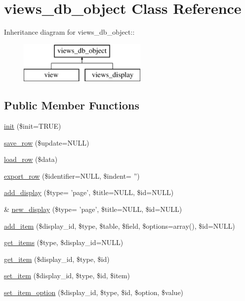 \hypertarget{classviews__db__object}{
\section{views\_\-db\_\-object Class Reference}
\label{classviews__db__object}
}
Inheritance diagram for views\_\-db\_\-object::\begin{figure}[H]
\begin{center}
\leavevmode
\includegraphics[height=2cm]{classviews__db__object}
\end{center}
\end{figure}
\subsection*{Public Member Functions}
\begin{CompactItemize}
\item 
\hyperlink{classviews__db__object_5c50d8a10b9af37afa7c7c2bfde5e318}{init} (\$init=TRUE)
\item 
\hyperlink{classviews__db__object_5e126880af73008d7ce245c24cfaebab}{save\_\-row} (\$update=NULL)
\item 
\hyperlink{classviews__db__object_4c8b658c58eb3ae319616f73a2106324}{load\_\-row} (\$data)
\item 
\hyperlink{classviews__db__object_0b0485d179ad553228534ae957e0ddc9}{export\_\-row} (\$identifier=NULL, \$indent= '')
\item 
\hyperlink{classviews__db__object_6e9c2b7bb3d5670fefde14518a38de95}{add\_\-display} (\$type= 'page', \$title=NULL, \$id=NULL)
\item 
\& \hyperlink{classviews__db__object_b7a8ea5c81d0c335d8e0fb87443349a3}{new\_\-display} (\$type= 'page', \$title=NULL, \$id=NULL)
\item 
\hyperlink{classviews__db__object_794e8375c5d243e52645675b31251ccc}{add\_\-item} (\$display\_\-id, \$type, \$table, \$field, \$options=array(), \$id=NULL)
\item 
\hyperlink{classviews__db__object_20a7ac553af0e4e8ee6f676dce4b844b}{get\_\-items} (\$type, \$display\_\-id=NULL)
\item 
\hyperlink{classviews__db__object_9c1010d4c58ebbda357940ac11c48ce1}{get\_\-item} (\$display\_\-id, \$type, \$id)
\item 
\hyperlink{classviews__db__object_4ac5fda69733790427be9edd7c717568}{set\_\-item} (\$display\_\-id, \$type, \$id, \$item)
\item 
\hyperlink{classviews__db__object_722d39805c26c9ae909e644f2f887a86}{set\_\-item\_\-option} (\$display\_\-id, \$type, \$id, \$option, \$value)
\end{CompactItemize}


